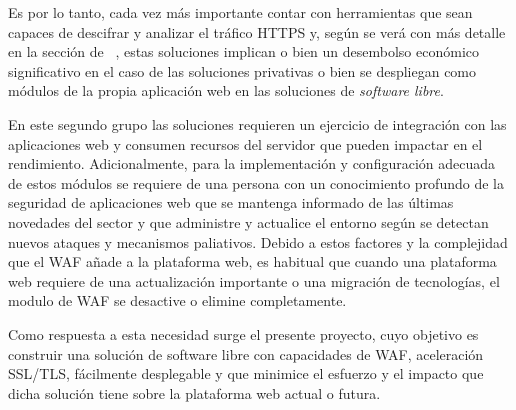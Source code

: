 \par Es por lo tanto, cada vez más importante contar con herramientas que sean capaces de descifrar y analizar el tráfico HTTPS y, según se verá con más detalle en la sección de ~, estas soluciones implican o bien un
desembolso económico significativo en el caso de las soluciones privativas o bien se despliegan como módulos de la propia aplicación web en las soluciones de {\em software libre\cite{softwarelibre}}.
\par En este segundo grupo las soluciones requieren un ejercicio de integración con las aplicaciones web y consumen recursos del servidor que pueden impactar en el rendimiento. Adicionalmente, para la implementación y configuración adecuada de
estos módulos se requiere de una persona con un conocimiento profundo de la seguridad de aplicaciones web que se mantenga informado de las últimas novedades del sector y que administre y actualice el entorno según se detectan nuevos ataques y
mecanismos paliativos.  Debido a estos factores y la complejidad que el WAF añade a la plataforma web, es habitual que cuando una plataforma web requiere de una actualización importante o una migración de tecnologías, el modulo de WAF se
desactive o elimine completamente.

\par Como respuesta a esta necesidad surge el presente proyecto, cuyo objetivo es construir una solución de software libre con capacidades de WAF, aceleración SSL/TLS, fácilmente desplegable y que minimice el esfuerzo y el impacto que dicha
solución tiene sobre la plataforma web actual o futura.
